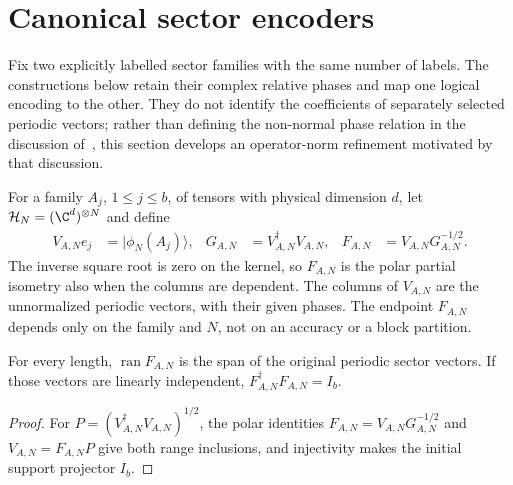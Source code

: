 \section{Canonical sector encoders}
\label{sec:ldp_sector_encoders}

Fix two explicitly labelled sector families with the same number of labels.
The constructions below retain their complex relative phases and map
one logical encoding to the other. They do not identify the coefficients of
separately selected periodic vectors; rather than defining the non-normal
phase relation in the discussion of~\cite{Malz2024Preparation}, this section
develops an operator-norm refinement motivated by that discussion.

\begin{definition}
    \label{def:ldp_sector_encoder}
    \leanok
    For a family $A_j$, $1\le j\le b$, of tensors with physical dimension
    $d$, let $\mathcal H_N=(\C^d)^{\otimes N}$ and define
    \begin{align}
        V_{A,N}e_j & =|\phi_N(A_j)\rangle,     &
        G_{A,N}    & =V_{A,N}^\dagger V_{A,N}, &
        F_{A,N}    & =V_{A,N}G_{A,N}^{-1/2}.
        \label{eq:ldp_canonical_encoder}
    \end{align}
    The inverse square root is zero on the kernel, so $F_{A,N}$ is the
    polar partial isometry also when the columns are dependent. The
    columns of $V_{A,N}$ are the unnormalized periodic vectors,
    with their given phases. The endpoint $F_{A,N}$ depends only on the
    family and $N$, not on an accuracy or a block partition.
\end{definition}

\begin{lemma}
    \label{thm:ldp_sector_encoder_range}
    \leanok
    For every length, $\operatorname{ran}F_{A,N}$ is the span of the
    original periodic sector vectors. If those vectors are linearly
    independent, $F_{A,N}^\dagger F_{A,N}=I_b$.
\end{lemma}
\begin{proof}\leanok
    For $P=(V_{A,N}^\dagger V_{A,N})^{1/2}$, the polar identities
    $F_{A,N}=V_{A,N}G_{A,N}^{-1/2}$ and $V_{A,N}=F_{A,N}P$ give both
    range inclusions, and injectivity makes the initial support projector
    $I_b$.
\end{proof}

